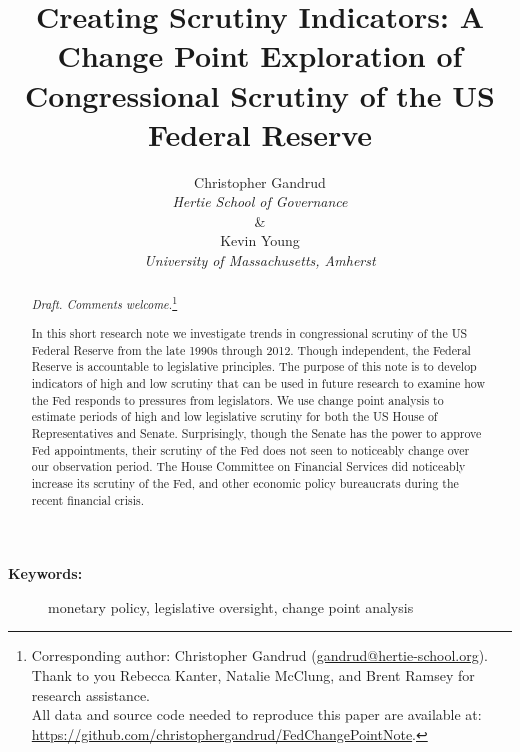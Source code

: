 \documentclass[a4paper]{article}\usepackage[]{graphicx}\usepackage[]{color}
\title{Creating Scrutiny Indicators: A Change Point Exploration of Congressional Scrutiny of the US Federal Reserve}
\author{Christopher Gandrud \\ {\emph{Hertie School of Governance}} \\ \& \\ Kevin Young \\ {\emph{University of Massachusetts, Amherst}}}
\begin{document}
\maketitle

\begin{abstract}

\noindent\emph{Draft. Comments welcome.}\footnote{Corresponding author: Christopher Gandrud (\href{mailto:gandrud@hertie-school.org}{gandrud@hertie-school.org}). \\ Thank to you Rebecca Kanter, Natalie McClung, and Brent Ramsey for research assistance. \\
All data and source code needed to reproduce this paper are available at: \url{https://github.com/christophergandrud/FedChangePointNote}.}

In this short research note we investigate trends in congressional scrutiny of the US Federal Reserve from the late 1990s through 2012. Though independent, the Federal Reserve is accountable to legislative principles. The purpose of this note is to develop indicators of high and low scrutiny that can be used in future research to examine how the Fed responds to pressures from legislators. We use change point analysis to estimate periods of high and low legislative scrutiny for both the US House of Representatives and Senate. Surprisingly, though the Senate has the power to approve Fed appointments, their scrutiny of the Fed does not seen to noticeably change over our observation period. The House Committee on Financial Services did noticeably increase its scrutiny of the Fed, and other economic policy bureaucrats during the recent financial crisis. 

\end{abstract}

\begin{description}
  \item [{\textbf{Keywords:}}] monetary policy, legislative oversight, change point analysis
\end{description}
\end{document}
